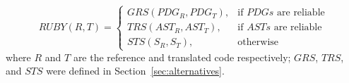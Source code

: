 $$
RUBY(R, T) = \begin{cases}
				GRS(PDG_R, PDG_T), 	& \mbox{if } PDGs\mbox{ are reliable} \\
				TRS(AST_R, AST_T), 	& \mbox{if } ASTs\mbox{ are reliable} \\
				STS(S_R, S_T), 	& \mbox{otherwise}
			\end{cases}
$$
where $R$ and $T$ are the reference and translated code respectively;
$GRS$, $TRS$, and $STS$ were defined in Section~\ref{sec:alternatives}.







